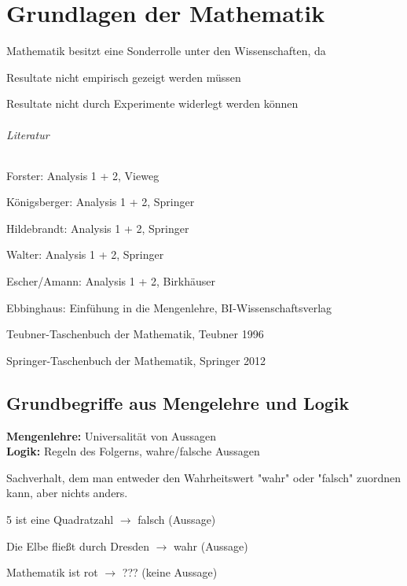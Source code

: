 \part{Grundlagen der Mathematik}

Mathematik besitzt eine Sonderrolle unter den Wissenschaften, da
\begin{compactitem}
	\item Resultate nicht empirisch gezeigt werden müssen
	\item Resultate nicht durch Experimente widerlegt werden können
\end{compactitem}

\paragraph{Literatur}
\begin{compactitem}
	\item Forster: Analysis 1 + 2, Vieweg
	\item Königsberger: Analysis 1 + 2, Springer
	\item Hildebrandt: Analysis 1 + 2, Springer
	\item Walter: Analysis 1 + 2, Springer
	\item Escher/Amann: Analysis 1 + 2, Birkhäuser
	\item Ebbinghaus: Einfühung in die Mengenlehre, BI-Wissenschaftsverlag
	\item Teubner-Taschenbuch der Mathematik, Teubner 1996
	\item Springer-Taschenbuch der Mathematik, Springer 2012
\end{compactitem}

\chapter{Grundbegriffe aus Mengelehre und Logik}
\textbf{Mengenlehre:} Universalität von Aussagen \\
\textbf{Logik:} Regeln des Folgerns, wahre/falsche Aussagen

\begin{mydef}
	Sachverhalt, dem man entweder den Wahrheitswert "wahr" oder "falsch" zuordnen kann, aber nichts anders.
\end{mydef}

\begin{exmp}
	\item 5 ist eine Quadratzahl $\to$ falsch (Aussage)
	\item Die Elbe fließt durch Dresden $\to$ wahr (Aussage)
	\item Mathematik ist rot $\to$ ??? (keine Aussage)
\end{exmp}

